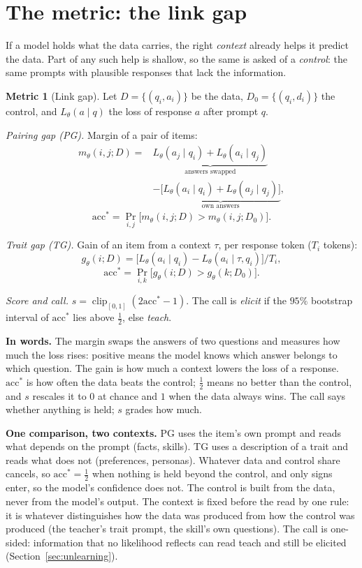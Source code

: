 \documentclass{article}
\theoremstyle{definition}
\newtheorem{metric}{Metric}
\DeclareMathOperator{\clip}{clip}
\newcommand{\acc}{\mathrm{acc}^*}
\begin{document}
\section{The metric: the link gap}
\label{sec:metric}

If a model holds what the data carries, the right \emph{context} already helps it predict the data. Part of any
such help is shallow, so the same is asked of a \emph{control}: the same prompts with plausible responses that
lack the information.

\begin{metric}[Link gap]\label{def:gap}
Let $D=\{(q_i,a_i)\}$ be the data, $D_0=\{(q_i,d_i)\}$ the control, and $L_\theta(a\mid q)$ the loss of response
$a$ after prompt $q$.

\emph{Pairing gap (PG).} Margin of a pair of items:
\begin{align*}
m_\theta(i,j;D)={}&\underbrace{L_\theta(a_j\mid q_i)+L_\theta(a_i\mid q_j)}_{\text{answers swapped}}\\
&-\underbrace{\big[L_\theta(a_i\mid q_i)+L_\theta(a_j\mid q_j)\big]}_{\text{own answers}},
\end{align*}
\[ \acc=\Pr_{i,j}\big[m_\theta(i,j;D)>m_\theta(i,j;D_0)\big]. \]

\emph{Trait gap (TG).} Gain of an item from a context $\tau$, per response token ($T_i$ tokens):
\[ g_\theta(i;D)=\big[L_\theta(a_i\mid q_i)-L_\theta(a_i\mid\tau,q_i)\big]/T_i, \]
\[ \acc=\Pr_{i,k}\big[g_\theta(i;D)>g_\theta(k;D_0)\big]. \]

\emph{Score and call.} $s=\clip_{[0,1]}(2\acc-1)$. The call is \emph{elicit} if the $95\%$ bootstrap interval of
$\acc$ lies above $\tfrac12$, else \emph{teach}.
\end{metric}

\textbf{In words.} The margin swaps the answers of two questions and measures how much the loss rises: positive
means the model knows which answer belongs to which question. The gain is how much a context lowers the loss of a
response. $\acc$ is how often the data beats the control; $\tfrac12$ means no better than the control, and $s$
rescales it to $0$ at chance and $1$ when the data always wins. The call says whether anything is held; $s$ grades
how much.

\textbf{One comparison, two contexts.} PG uses the item's own prompt and reads what depends on the prompt
(facts, skills). TG uses a description of a trait and reads what does not (preferences, personas).
Whatever data and control share cancels, so $\acc=\tfrac12$ when nothing is held beyond the control, and only signs
enter, so the model's confidence does not. The control is built from the data, never from the model's output. The
context is fixed before the read by one rule: it is whatever distinguishes how the data was produced from how the
control was produced (the teacher's trait prompt, the skill's own questions). The
call is one-sided: information that no likelihood reflects can read teach and still be elicited
(Section~\ref{sec:unlearning}).
\end{document}
